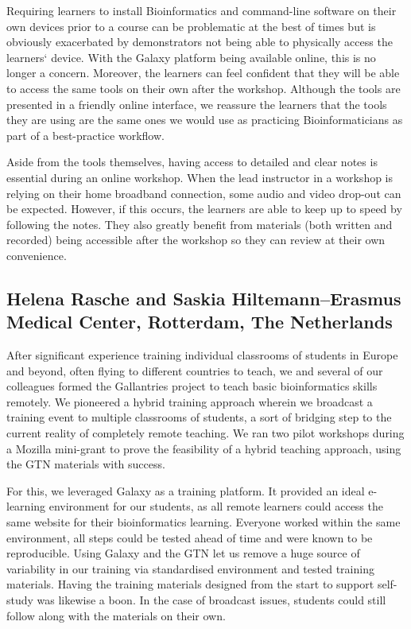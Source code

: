 Requiring learners to install Bioinformatics and command-line software on their own devices prior to a course can be problematic at the best of times but is obviously exacerbated by demonstrators not being able to physically access the learners` device. With the Galaxy platform being available online, this is no longer a concern. Moreover, the learners can feel confident that they will be able to access the same tools on their own after the workshop. Although the tools are presented in a friendly online interface, we reassure the learners that the tools they are using are the same ones we would use as practicing Bioinformaticians as part of a best-practice workflow.

Aside from the tools themselves, having access to detailed and clear notes is essential during an online workshop. When the lead instructor in a workshop is relying on their home broadband connection, some audio and video drop-out can be expected. However, if this occurs, the learners are able to keep up to speed by following the notes. They also greatly benefit from materials (both written and recorded) being accessible after the workshop so they can review at their own convenience.

\subsection*{Helena Rasche and Saskia Hiltemann–Erasmus Medical Center, Rotterdam, The Netherlands}


After significant experience training individual classrooms of students in Europe and beyond, often flying to different countries to teach, we and several of our colleagues formed the Gallantries project to teach basic bioinformatics skills remotely. We pioneered a hybrid training approach wherein we broadcast a training event to multiple classrooms of students, a sort of bridging step to the current reality of completely remote teaching. We ran two pilot workshops during a Mozilla mini-grant to prove the feasibility of a hybrid teaching approach, using the GTN materials with success.

For this, we leveraged Galaxy as a training platform. It provided an ideal e-learning environment for our students, as all remote learners could access the same website for their bioinformatics learning. Everyone worked within the same environment, all steps could be tested ahead of time and were known to be reproducible. Using Galaxy and the GTN let us remove a huge source of variability in our training via standardised environment and tested training materials. Having the training materials designed from the start to support self-study was likewise a boon. In the case of broadcast issues, students could still follow along with the materials on their own.

